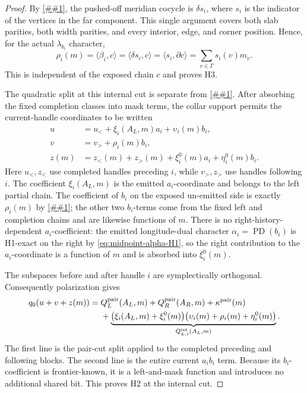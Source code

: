 \documentclass[11pt]{article}
\newcommand{\cref}[1]{\autoref{##1}}%
\begin{document}
\begin{proof}
By \cref{lem:planar-arc}, the pushed-off meridian cocycle is
\(\delta s_i\), where \(s_i\) is the indicator of the vertices in the far
component.  This single argument covers both slab parities, both width
parities, and every interior, edge, and corner position.  Hence, for the
actual \(\lambda_{b_i}\) character,
\begin{equation}\label{eq:stokes}
 \rho_i(m)=\langle\beta_i,c\rangle
          =\langle\delta s_i,c\rangle
          =\langle s_i,\partial c\rangle
          =\sum_{v\in\Gamma}s_i(v)m_v .
\end{equation}
This is independent of the exposed chain \(c\) and proves H3.

The quadratic split at this internal cut is separate from
\cref{eq:grid-H2}.  After absorbing the fixed completion classes into mask
terms, the collar support permits the current-handle coordinates to be
written
\begin{equation}\label{eq:internal-coordinates}
 \begin{split}
 u&=u_{<}+\xi_i(A_L,m)a_i+\upsilon_i(m)b_i,\\
 v&=v_{>}+\rho_i(m)b_i,\\
 z(m)&=z_{<}(m)+z_{>}(m)+\xi_i^0(m)a_i+\eta_i^0(m)b_i.
 \end{split}
\end{equation}
Here \(u_<,z_<\) use completed handles preceding \(i\), while
\(v_>,z_>\) use handles following \(i\).  The coefficient
\(\xi_i(A_L,m)\) is the emitted \(a_i\)-coordinate and belongs to the left
partial chain.  The coefficient of \(b_i\) on the exposed un-emitted side is
exactly \(\rho_i(m)\) by \cref{eq:stokes}; the other two \(b_i\)-terms come
from the fixed left and completion chains and are likewise functions of
\(m\).  There is no right-history-dependent \(a_i\)-coefficient: the emitted
longitude-dual character \(\alpha_i=\operatorname{PD}(b_i)\) is H1-exact on
the right by \eqref{eq:midpoint-alpha-H1}, so the right contribution to the
\(a_i\)-coordinate is a function of \(m\) and is absorbed into
\(\xi_i^0(m)\).

The subspaces before and after handle \(i\) are symplectically orthogonal.
Consequently polarization gives
\begin{align}
 q_0(u+v+z(m))
 ={}&Q_L^{\rm pair}(A_L,m)+Q_R^{\rm pair}(A_R,m)
       +\kappa^{\rm pair}(m)\notag\\
 &+\underbrace{
   \bigl(\xi_i(A_L,m)+\xi_i^0(m)\bigr)
   \bigl(\upsilon_i(m)+\rho_i(m)+\eta_i^0(m)\bigr)
   }_{Q_{L,i}^{\rm int}(A_L,m)} .                 \label{eq:grid-H2-internal}
\end{align}
The first line is the pair-cut split applied to the completed preceding and
following blocks.  The second line is the entire current \(a_ib_i\) term.
Because its \(b_i\)-coefficient is frontier-known, it is a left-and-mask
function and introduces no additional shared bit.  This proves H2 at the
internal cut.


\end{proof}
\end{document}

